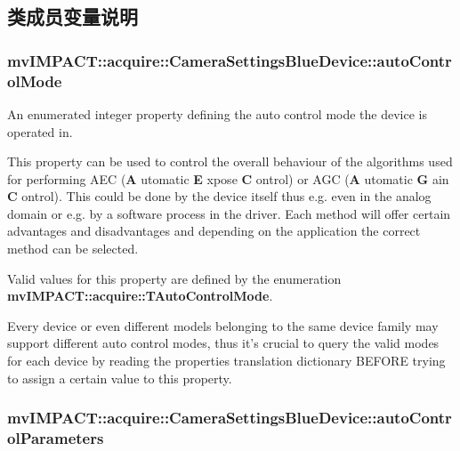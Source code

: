 \subsection{类成员变量说明}
\hypertarget{classmv_i_m_p_a_c_t_1_1acquire_1_1_camera_settings_blue_device_a4332b415ee1aa70f66f1c229f2149f71}{
\subsubsection[{auto\+Control\+Mode}]{ mv\+I\+M\+P\+A\+C\+T\+::acquire\+::\+Camera\+Settings\+Blue\+Device\+::auto\+Control\+Mode}}\label{classmv_i_m_p_a_c_t_1_1acquire_1_1_camera_settings_blue_device_a4332b415ee1aa70f66f1c229f2149f71}


An enumerated integer property defining the auto control mode the device is operated in. 

This property can be used to control the overall behaviour of the algorithms used for performing A\+E\+C ({\bfseries A} utomatic {\bfseries E} xpose {\bfseries C} ontrol) or A\+G\+C ({\bfseries A} utomatic {\bfseries G} ain {\bfseries C} ontrol). This could be done by the device itself thus e.\+g. even in the analog domain or e.\+g. by a software process in the driver. Each method will offer certain advantages and disadvantages and depending on the application the correct method can be selected.

Valid values for this property are defined by the enumeration {\bfseries mv\+I\+M\+P\+A\+C\+T\+::acquire\+::\+T\+Auto\+Control\+Mode}.

Every device or even different models belonging to the same device family may support different auto control modes, thus it's crucial to query the valid modes for each device by reading the properties translation dictionary B\+E\+F\+O\+R\+E trying to assign a certain value to this property. \hypertarget{classmv_i_m_p_a_c_t_1_1acquire_1_1_camera_settings_blue_device_af360308aed6a5ebc938f4fd19b2ebe6f}{
\subsubsection[{auto\+Control\+Parameters}]{ mv\+I\+M\+P\+A\+C\+T\+::acquire\+::\+Camera\+Settings\+Blue\+Device\+::auto\+Control\+Parameters}}\label{classmv_i_m_p_a_c_t_1_1acquire_1_1_camera_settings_blue_device_af360308aed6a5ebc938f4fd19b2ebe6f}


